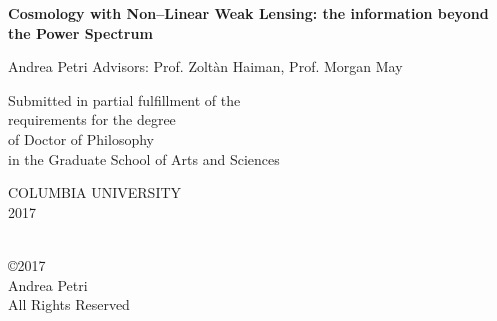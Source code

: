 \thispagestyle{empty}


\def\thesistitle{Cosmology with Non--Linear Weak Lensing: the information beyond the Power Spectrum}

\pagestyle{empty}

\begin{center}

{\Large \bf \thesistitle}

\vskip1.5in

{\Large  Andrea Petri } %
\vskip0.5in
{\Large  Advisors: Prof. Zolt\`an Haiman, Prof. Morgan May} 



\vskip1.1in


\large
Submitted in partial fulfillment of the               \\
requirements for the degree                           \\
of Doctor of Philosophy                               \\
in the Graduate School of Arts and Sciences           \\

\vskip0.5in

COLUMBIA UNIVERSITY                                   \\
2017                                                  \\

\end{center}


\clearpage


\begin{center}
\ \\
\vskip5.5in
\copyright 2017 \\[3mm]
Andrea Petri\\
All Rights Reserved
\end{center}
\clearpage
